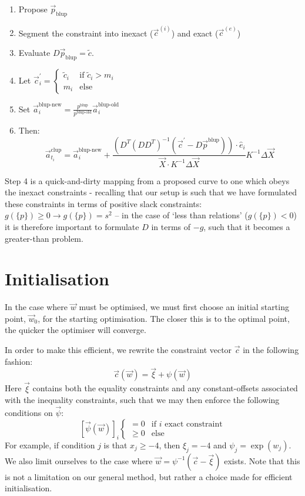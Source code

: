 \documentclass[]{article}
\def\ai{\vec{a}_{t_i}}
\begin{document}
			\begin{enumerate}
				\item Propose $\vec{p}_\text{blup}$
				\item Segment the constraint into inexact ($\vec{c}^{(i)}$) and exact ($\vec{c}^(e)$)
				\item Evaluate $D \vec{p}_\text{blup} = \tilde{c}$. 
				\item Let $\vec{c}^\prime_i = \begin{cases} 
					\tilde{c}_i & \text{if } \tilde{c}_i > m_i
					\\
					m_i & \text{else}
				\end{cases}$
				\item Set $\vec{a}_i^\text{blup-new} = \frac{p^\text{blup}}{p^\text{blup-old}} \vec{a}_i^\text{blup-old}$
				\item Then:
				$$ \ai^\text{clup} = \vec{a}_i^\text{blup-new} +  \frac{\left(D^T \left(D D^T \right)^{-1} \left(\vec{c}^\prime - D \vec{p}^\text{blup}\right)\right)\cdot \hat{e}_i}{\vec{X} \cdot K^{-1} \Delta\vec{X}} K^{-1} \Delta\vec{X}$$
			\end{enumerate}
			Step 4 is a quick-and-dirty mapping from a proposed curve to one which obeys the inexact constraints - recalling that our setup is such that we have formulated these constraints in terms of positive slack constraints: $g(\{p\}) \geq 0 \to g(\{p\}) = s^2$ -- in the case of `less than relations' ($g(\{p\})<0$) it is therefore important to formulate $D$ in terms of $-g$, such that it becomes a greater-than problem.


		\section{Initialisation}

			In the case where $\vec{w}$ must be optimised, we must first choose an initial starting point, $\vec{w}_0$, for the starting optimisation. The closer this is to the optimal point, the quicker the optimiser will converge.

			In order to make this efficient, we rewrite the constraint vector $\vec{c}$ in the following fashion:
			\begin{equation}
				\vec{c}(\vec{w}) = \vec{\xi} + \psi(\vec{w})
			\end{equation}
			Here $\vec{\xi}$ contains both the equality constraints and any constant-offsets associated with the inequality constraints, such that we may then enforce the following conditions on $\vec{\psi}$:
			\begin{equation}
				\left[ \vec{\psi}(\vec{w}) \right]_i  \begin{cases}
						= 0 & \text{if $i$ exact constraint}
						\\
						\geq 0 & \text{else}
					\end{cases}
			\end{equation}
			For example, if condition $j$ is that $x_j \geq -4$, then $\xi_j = -4$ and $\psi_j = \exp(w_j)$. We also limit ourselves to the case where $\vec{w} = \psi^{-1}(\vec{c} - \vec{\xi})$ exists. Note that this is not a limitation on our general method, but rather a choice made for efficient initialisation.
\end{document}
